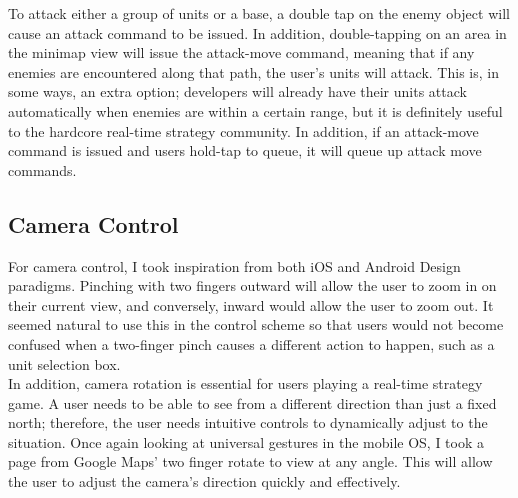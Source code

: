 \documentclass[11pt]{article}
\begin{document}
	\indent To attack either a group of units or a base, a double tap on the enemy object will cause an attack command to be issued. In addition, double-tapping on an area in the minimap view will issue the attack-move command, meaning that if any enemies are encountered along that path, the user's units will attack. This is, in some ways, an extra option; developers will already have their units attack automatically when enemies are within a certain range, but it is definitely useful to the hardcore real-time strategy community. In addition, if an attack-move command is issued and users hold-tap to queue, it will queue up attack move commands.
	\subsection{Camera Control}
	For camera control, I took inspiration from both iOS and Android Design paradigms. %
Pinching with two fingers outward will allow the user to zoom in on their current view, and conversely, inward would allow the user to zoom out. It seemed natural to use this in the control scheme so that users would not become confused when a two-finger pinch causes a different action to happen, such as a unit selection box. \\ %
	\indent In addition, camera rotation is essential for users playing a real-time strategy game. A user needs to be able to see from a different direction than just a fixed north; therefore, the user needs intuitive controls to dynamically adjust to the situation. Once again looking at universal gestures in the mobile OS, I took a page from Google Maps' two finger rotate to view at any angle. This will allow the user to adjust the camera's direction quickly and effectively. %
\end{document}
